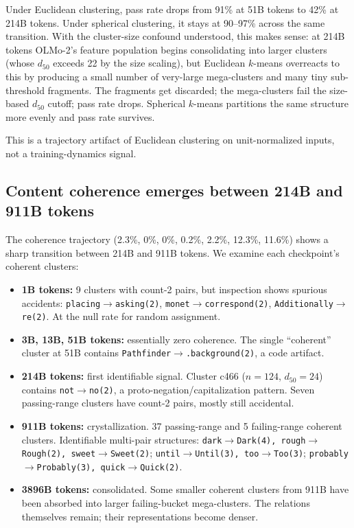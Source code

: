 \documentclass[11pt,letterpaper]{article}
\begin{document}
Under Euclidean clustering, pass rate drops from 91\% at 51B tokens to 42\% at 214B tokens. Under spherical clustering, it stays at 90--97\% across the same transition. With the cluster-size confound understood, this makes sense: at 214B tokens OLMo-2's feature population begins consolidating into larger clusters (whose $d_{50}$ exceeds 22 by the size scaling), but Euclidean $k$-means overreacts to this by producing a small number of very-large mega-clusters and many tiny sub-threshold fragments. The fragments get discarded; the mega-clusters fail the size-based $d_{50}$ cutoff; pass rate drops. Spherical $k$-means partitions the same structure more evenly and pass rate survives.

This is a trajectory artifact of Euclidean clustering on unit-normalized inputs, not a training-dynamics signal.

\subsection{Content coherence emerges between 214B and 911B tokens}

The coherence trajectory (2.3\%, 0\%, 0\%, 0.2\%, 2.2\%, 12.3\%, 11.6\%) shows a sharp transition between 214B and 911B tokens. We examine each checkpoint's coherent clusters:

\begin{itemize}[leftmargin=*]
\item \textbf{1B tokens:} 9 clusters with count-2 pairs, but inspection shows spurious accidents: \texttt{placing$\to$asking(2)}, \texttt{monet$\to$correspond(2)}, \texttt{Additionally$\to$re(2)}. At the null rate for random assignment.
\item \textbf{3B, 13B, 51B tokens:} essentially zero coherence. The single ``coherent'' cluster at 51B contains \texttt{Pathfinder$\to$.background(2)}, a code artifact.
\item \textbf{214B tokens:} first identifiable signal. Cluster c466 ($n=124$, $d_{50}=24$) contains \texttt{not$\to$no(2)}, a proto-negation/capitalization pattern. Seven passing-range clusters have count-2 pairs, mostly still accidental.
\item \textbf{911B tokens:} crystallization. 37 passing-range and 5 failing-range coherent clusters. Identifiable multi-pair structures: \texttt{dark$\to$Dark(4), rough$\to$Rough(2), sweet$\to$Sweet(2)}; \texttt{until$\to$Until(3), too$\to$Too(3)}; \texttt{probably$\to$Probably(3), quick$\to$Quick(2)}.
\item \textbf{3896B tokens:} consolidated. Some smaller coherent clusters from 911B have been absorbed into larger failing-bucket mega-clusters. The relations themselves remain; their representations become denser.
\end{itemize}
\end{document}
